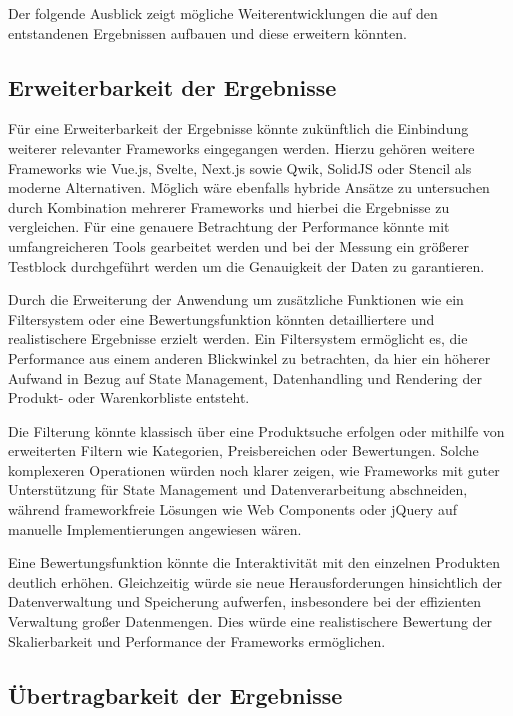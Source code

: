 \documentclass[oneside]{ausarbeitung}
\begin{document}
Der folgende Ausblick zeigt mögliche Weiterentwicklungen die auf den entstandenen Ergebnissen aufbauen und diese erweitern könnten.

\subsection{Erweiterbarkeit der Ergebnisse}
\label{sub:erweiterbarkeit}

Für eine Erweiterbarkeit der Ergebnisse könnte zukünftlich die Einbindung weiterer relevanter Frameworks eingegangen werden. Hierzu gehören weitere Frameworks wie Vue.js, Svelte, Next.js sowie Qwik, SolidJS oder Stencil als moderne Alternativen. Möglich wäre ebenfalls hybride Ansätze zu untersuchen durch Kombination mehrerer Frameworks und hierbei die Ergebnisse zu vergleichen. Für eine genauere Betrachtung der Performance könnte mit umfangreicheren Tools gearbeitet werden und bei der Messung ein größerer Testblock durchgeführt werden um die Genauigkeit der Daten zu garantieren. 

Durch die Erweiterung der Anwendung um zusätzliche Funktionen wie ein Filtersystem oder eine Bewertungsfunktion könnten detailliertere und realistischere Ergebnisse erzielt werden. Ein Filtersystem ermöglicht es, die Performance aus einem anderen Blickwinkel zu betrachten, da hier ein höherer Aufwand in Bezug auf State Management, Datenhandling und Rendering der Produkt- oder Warenkorbliste entsteht.

Die Filterung könnte klassisch über eine Produktsuche erfolgen oder mithilfe von erweiterten Filtern wie Kategorien, Preisbereichen oder Bewertungen. Solche komplexeren Operationen würden noch klarer zeigen, wie Frameworks mit guter Unterstützung für State Management und Datenverarbeitung abschneiden, während frameworkfreie Lösungen wie Web Components oder jQuery auf manuelle Implementierungen angewiesen wären.

Eine Bewertungsfunktion könnte die Interaktivität mit den einzelnen Produkten deutlich erhöhen. Gleichzeitig würde sie neue Herausforderungen hinsichtlich der Datenverwaltung und Speicherung aufwerfen, insbesondere bei der effizienten Verwaltung großer Datenmengen. Dies würde eine realistischere Bewertung der Skalierbarkeit und Performance der Frameworks ermöglichen.

\subsection{Übertragbarkeit der Ergebnisse}
\label{sub:uebertragbarkeit}
\end{document}
